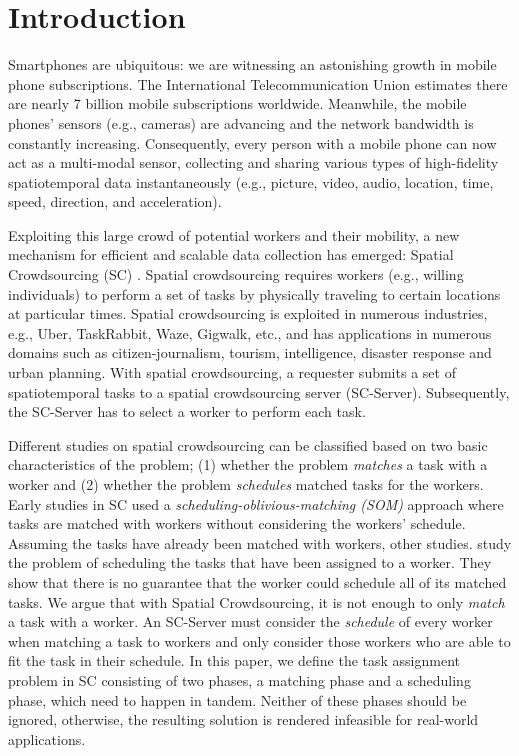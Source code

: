 \vspace{-0.2in}
\section{Introduction}
\vspace{-0.1in}

Smartphones are ubiquitous: we are witnessing an astonishing growth in mobile phone subscriptions. The International Telecommunication Union estimates there are nearly 7 billion mobile subscriptions worldwide. Meanwhile, the mobile phones' sensors (e.g., cameras) are advancing and the network bandwidth is constantly increasing. Consequently, every person with a mobile phone can now act as a multi-modal sensor, collecting and sharing various types of high-fidelity spatiotemporal data instantaneously (e.g., picture, video, audio, location, time, speed, direction, and acceleration).

Exploiting this large crowd of potential workers and their mobility, a new mechanism for efficient and scalable data collection has emerged: Spatial Crowdsourcing (SC) \cite{Kazemi12}. Spatial crowdsourcing requires workers (e.g., willing individuals) to perform a set of tasks by physically traveling to certain locations at particular times. Spatial crowdsourcing is exploited in numerous industries, e.g., Uber, TaskRabbit, Waze, Gigwalk, etc., and has applications in numerous domains such as citizen-journalism, tourism, intelligence, disaster response and urban planning. With spatial crowdsourcing, a requester submits a set of spatiotemporal tasks to a spatial crowdsourcing server (SC-Server). Subsequently, the SC-Server has to select a worker to perform each task.

Different studies on spatial crowdsourcing \cite{Kazemi12,Li15,Deng15,Chen15,Cheng16,Fonteles15,Guo16} can be classified based on two basic characteristics of the problem; (1) whether the problem \textit{matches} a task with a worker and (2) whether the problem \textit{schedules} matched tasks for the workers. Early studies in SC \cite{Kazemi12,Fonteles15,Cheng16} used a \textit{scheduling-oblivious-matching (SOM)} approach where tasks are matched with workers without considering the workers' schedule. Assuming the tasks have already been matched with workers, other studies. \cite{Deng13,Li15} study the problem of  scheduling the tasks that have been assigned to a worker. They show that there is no guarantee that the worker could schedule all of its matched tasks. We argue that with Spatial Crowdsourcing, it is not enough to only \textit{match} a task with a worker. An SC-Server must consider the \textit{schedule} of every worker when matching a task to workers and only consider those workers who are able to fit the task in their schedule. In this paper, we define the task assignment problem in SC consisting of two phases, a matching phase and a scheduling phase, which need to happen in tandem. Neither of these phases should be ignored, otherwise, the resulting solution is rendered infeasible for real-world applications.

